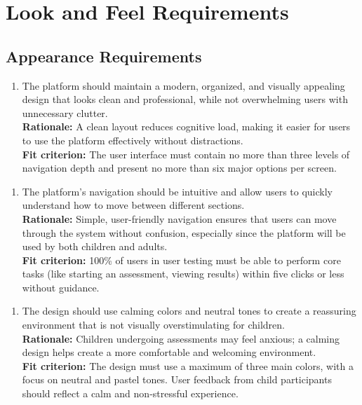 \documentclass[12pt]{article}
\begin{document}
\section{Look and Feel Requirements}
\subsection{Appearance Requirements}
\begin{enumerate}[{LF-AR}1. ]
  \item The platform should maintain a modern, organized, and visually appealing design that looks clean and professional, while not 
  overwhelming users with unnecessary clutter.\\
  \textbf{Rationale: }A clean layout reduces cognitive load, making it easier for users to use the platform effectively without distractions.\\
  \textbf{Fit criterion: }The user interface must contain no more than three levels of navigation depth and present no more than six major options per screen.  
\end{enumerate}
\begin{enumerate}[{LF-AR}2. ]
  \item The platform’s navigation should be intuitive and allow users to quickly understand how to move between different sections.\\
  \textbf{Rationale: }Simple, user-friendly navigation ensures that users can move through the system without confusion, especially since the platform will be used by both children and adults.\\
  \textbf{Fit criterion: }100\% of users in user testing must be able to perform core tasks (like starting an assessment, viewing results) within five clicks or less without guidance.  
\end{enumerate}
\begin{enumerate}[{LF-AR}3. ]
  \item The design should use calming colors and neutral tones to create a reassuring environment that is not visually overstimulating for children.\\
  \textbf{Rationale: }Children undergoing assessments may feel anxious; a calming design helps create a more comfortable and welcoming environment.\\
  \textbf{Fit criterion: }The design must use a maximum of three main colors, with a focus on neutral and pastel tones. User feedback from child participants should reflect a calm and non-stressful experience.  
\end{enumerate}
\end{document}
